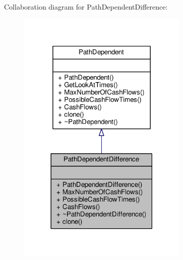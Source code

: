 Collaboration diagram for Path\+Dependent\+Difference\+:
\nopagebreak
\begin{figure}[H]
\begin{center}
\leavevmode
\includegraphics[width=230pt]{classPathDependentDifference__coll__graph}
\end{center}
\end{figure}
